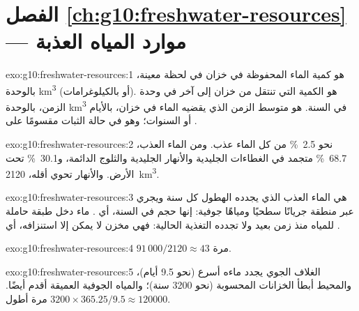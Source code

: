 \section*{الفصل \ref{ch:g10:freshwater-resources} --- موارد المياه العذبة}

\begin{solution}{exo:g10:freshwater-resources:1}
 هو كمية الماء المحفوظة في خزان في لحظة معينة، بالوحدة
\unit{km^3} (أو بالكيلوغرامات).  هو الكمية التي تنتقل من خزان إلى آخر في وحدة
الزمن، بالوحدة \unit{km^3} في السنة.  هو متوسط الزمن الذي يقضيه الماء في
خزان، بالأيام أو السنوات؛ وهو في حالة الثبات  مقسومًا على .
\end{solution}

\begin{solution}{exo:g10:freshwater-resources:2}
نحو \qty{2.5}{\percent} من كل الماء عذب. ومن الماء العذب،
\qty{68.7}{\percent} متجمد في الغطاءات الجليدية والأنهار الجليدية والثلوج الدائمة،
و\qty{30.1}{\percent} تحت الأرض. والأنهار تحوي أقله،
\num{2120}~\unit{km^3}.
\end{solution}

\begin{solution}{exo:g10:freshwater-resources:3}
 هي الماء العذب الذي يجدده الهطول كل سنة ويجري عبر منطقة
جريانًا سطحيًا ومياهًا جوفية: إنها حجم في السنة، أي . 
ماء دخل طبقة حاملة للمياه منذ زمن بعيد ولا تجدده التغذية الحالية: فهي مخزن لا يمكن
إلا استنزافه، أي .
\end{solution}

\begin{solution}{exo:g10:freshwater-resources:4}
$91\,000/2120 \approx 43$ مرة.
\end{solution}

\begin{solution}{exo:g10:freshwater-resources:5}
الغلاف الجوي يجدد ماءه أسرع (نحو \num{9.5} أيام)، والمحيط أبطأ
الخزانات المحسوبة (نحو \num{3200} سنة)؛ والمياه الجوفية العميقة أقدم أيضًا.
$3200 \times 365.25/9.5 \approx \num{120000}$
مرة أطول.
\end{solution}

